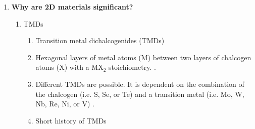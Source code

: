 \documentclass{article}
\begin{document}
\begin{enumerate}
\begin{enumerate}
		\end{enumerate} %
	\item{\textbf{Why are 2D materials significant?}}

		\begin{enumerate} %
			\item{TMDs}
				\begin{enumerate}
					\item{Transition metal dichalcogenides (TMDs)}
					\item{Hexagonal layers of metal atoms ($\mathrm{M}$) between two layers of chalcogen atoms ($\mathrm{X}$) with a $\mathrm{MX}_2$ stoichiometry. \cite{grapheneLike2Dreview2013}.}
					\item{Different TMDs are possible. It is dependent on the combination of the chalcogen (i.e. S, Se, or Te) and a transition metal (i.e. Mo, W, Nb, Re, Ni, or V) \cite{WilsonTMDs1969, grapheneLike2Dreview2013}.}
					\item{Short history of TMDs}
				\end{enumerate}
	

\end{enumerate}
\end{enumerate}
\end{document}
